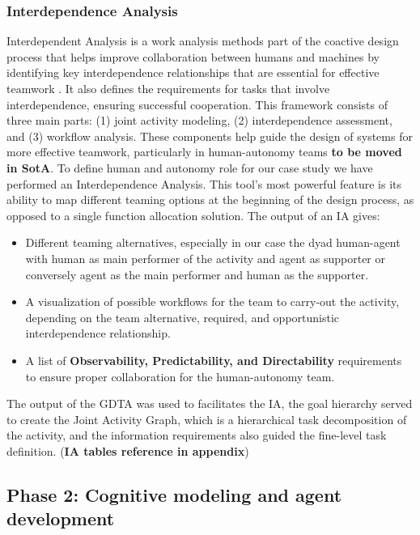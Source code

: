 \documentclass[12pt,a4paper]{article} %
\begin{document}
	\subsubsection{Interdependence Analysis}
	Interdependent Analysis is a work analysis methods part of the coactive design process that helps improve collaboration between humans and machines by identifying key interdependence relationships that are essential for effective teamwork \parencite{johnson_coactive_2014}. It also defines the requirements for tasks that involve interdependence, ensuring successful cooperation. This framework consists of three main parts: (1) joint activity modeling, (2) interdependence assessment, and (3) workflow analysis. These components help guide the design of systems for more effective teamwork, particularly in human-autonomy teams \parencite{johnson_understanding_2018} \textbf{to be moved in SotA}.
	To define human and autonomy role for our case study we have performed an Interdependence Analysis. This tool's most powerful feature is its ability to map different teaming options at the beginning of the design process, as opposed to a single function allocation solution. The output of an IA gives:
	\begin{itemize}
		\item Different teaming alternatives, especially in our case the dyad human-agent with human as main performer of the activity and agent as supporter or conversely agent as the main performer and human as the supporter.
		\item A visualization of possible workflows for the team to carry-out the activity, depending on the team alternative, required, and opportunistic interdependence relationship.
		\item A list of \textbf{Observability, Predictability, and Directability} requirements to ensure proper collaboration for the human-autonomy team.
	\end{itemize}
	The output of the GDTA was used to facilitates the IA, the goal hierarchy served to create the Joint Activity Graph, which is a hierarchical task decomposition of the activity, and the information requirements also guided the fine-level task definition. (\textbf{IA tables reference in appendix})
	\subsection{Phase 2: Cognitive modeling and agent development}
\end{document}
